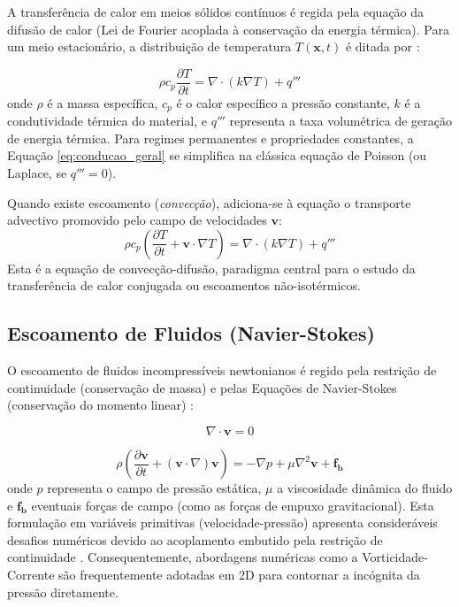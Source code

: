 A transferência de calor em meios sólidos contínuos é regida pela equação da difusão de calor (Lei de Fourier acoplada à conservação da energia térmica). Para um meio estacionário, a distribuição de temperatura $T(\mathbf{x}, t)$ é ditada por \cite{Incropera2006}:

\begin{equation}
\rho c_p \frac{\partial T}{\partial t} = \nabla \cdot (k \nabla T) + q'''
\label{eq:conducao_geral}
\end{equation}
onde $\rho$ é a massa específica, $c_p$ é o calor específico a pressão constante, $k$ é a condutividade térmica do material, e $q'''$ representa a taxa volumétrica de geração de energia térmica. Para regimes permanentes e propriedades constantes, a Equação \ref{eq:conducao_geral} se simplifica na clássica equação de Poisson (ou Laplace, se $q''' = 0$).

Quando existe escoamento (\textit{convecção}), adiciona-se à equação o transporte advectivo promovido pelo campo de velocidades $\mathbf{v}$:
\begin{equation}
\rho c_p \left( \frac{\partial T}{\partial t} + \mathbf{v} \cdot \nabla T \right) = \nabla \cdot (k \nabla T) + q'''
\label{eq:conveccao_difusao}
\end{equation}
Esta é a equação de convecção-difusão, paradigma central para o estudo da transferência de calor conjugada ou escoamentos não-isotérmicos.

\subsection{Escoamento de Fluidos (Navier-Stokes)}

O escoamento de fluidos incompressíveis newtonianos é regido pela restrição de continuidade (conservação de massa) e pelas Equações de Navier-Stokes (conservação do momento linear) \cite{White2006}:

\begin{equation}
\nabla \cdot \mathbf{v} = 0
\label{eq:continuidade}
\end{equation}

\begin{equation}
\rho \left( \frac{\partial \mathbf{v}}{\partial t} + (\mathbf{v} \cdot \nabla) \mathbf{v} \right) = -\nabla p + \mu \nabla^2 \mathbf{v} + \mathbf{f_b}
\label{eq:navier_stokes_vel_pressao}
\end{equation}
onde $p$ representa o campo de pressão estática, $\mu$ a viscosidade dinâmica do fluido e $\mathbf{f_b}$ eventuais forças de campo (como as forças de empuxo gravitacional). Esta formulação em variáveis primitivas (velocidade-pressão) apresenta consideráveis desafios numéricos devido ao acoplamento embutido pela restrição de continuidade \cite{Maliska2004}. Consequentemente, abordagens numéricas como a Vorticidade-Corrente são frequentemente adotadas em 2D para contornar a incógnita da pressão diretamente.

